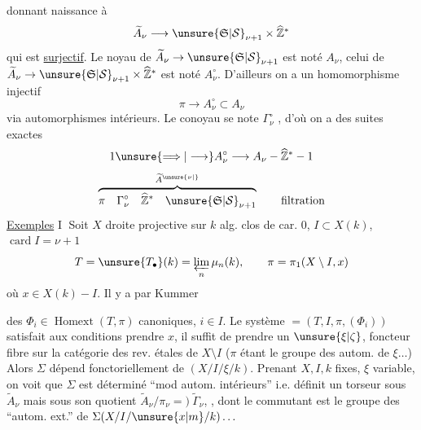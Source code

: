 donnant naissance à
\[
\widetilde A_\nu\longrightarrow\unsure{\mathfrak S|\mathcal S}_{\nu+1}\times\widehat{\mathbb Z}^{*}
\]
qui est \uline{surjectif}. Le noyau de $\widetilde A_\nu\to\unsure{\mathfrak S|\mathcal S}_{\nu+1}$
est noté $A_\nu$, celui de $\widetilde A_\nu\to\unsure{\mathfrak S|\mathcal S}_{\nu+1}\times\widehat{\mathbb Z}^{*}$
est noté $A_\nu^\circ$. D'ailleurs on a
un homomorphisme injectif
\[
\pi\longrightarrow A_\nu^\circ\subset A_\nu
\]
via automorphismes intérieurs. Le conoyau
se  note $\Gamma_\nu^\circ$ \inserted{($\Gamma_\nu$, $\widetilde\Gamma_\nu$)}, d'où on a des
suites exactes
\[
1\unsure{\Longrightarrow|\longrightarrow} A_\nu^\circ\longrightarrow A_\nu-\widehat{\mathbb Z}^{*}-1
\]
\[
\overbrace{\pi\quad\Gamma_\nu^\circ\quad\widehat{\mathbb Z}^{*}\quad\unsure{\mathfrak S|\mathcal S}_{\nu+1}}^{\widetilde A^{\unsure{\nu|\vphantom{\nu}}}}
\qquad\text{filtration}
\]
\uline{Exemples} \textcircled{I} Soit $X$ droite projective sur
$k$ alg. clos de car. $0$, $I\subset X(k)$, $\operatorname{card}I=\nu+1$
\[
T=\unsure{T_{\bullet}}(k)=\varprojlim_n\mu_n(k),\qquad
\pi=\pi_1(X\setminus I,x)
\]
où $x\in X(k)-I$. Il  y a par Kummer

des $\Phi_i\in\operatorname{Homext}(T,\pi)$ canoniques,
$i\in I$. Le système
$=(T,I,\pi,(\Phi_i))$
satisfait aux conditions  
   prendre $x$, il suffit
de prendre un $\unsure{\xi|\zeta}$, foncteur fibre sur
la catégorie des rev. étales de $X\setminus I$
($\pi$ étant le groupe des autom. de $\xi\ldots$)
Alors $\Sigma$ dépend fonctoriellement de
$(X/I/\xi/k)$. Prenant $X,I,k$ fixes,
$\xi$ variable, on voit que $\Sigma$ est déterminé
``mod autom. intérieurs'' i.e. 
définit un torseur  
sous $\widetilde A_\nu$ mais sous son quotient
$\widetilde A_\nu/\pi_\nu=)\ \widetilde\Gamma_\nu$,
, 
dont le commutant est le groupe
des ``autom. ext.'' de 
$\Sigma(X/I/\unsure{x|m}/k)\ldots$

